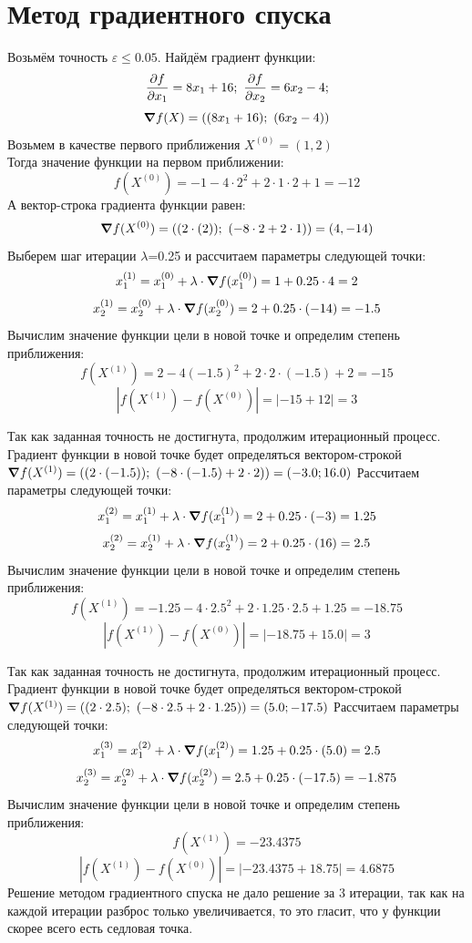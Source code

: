 \documentclass{article}
\begin{document}
\section*{Метод градиентного спуска}
Возьмём точность $\varepsilon \leq 0.05$. Найдём градиент функции:
\[\pdv{f}{x_1} = 8x_1+16;\ \pdv{f}{x_2} = 6x_2-4;\]
\[\grad f(X) = ((8x_1+16);\ (6x_2-4))\]
Возьмем в качестве первого приближения $X^{(0)} = (1, 2)$\\
Тогда значение функции на первом приближении:
\[f(X^{(0)}) = -1-4\cdot 2^2 + 2\cdot 1\cdot 2+ 1 = -12\]
А вектор-строка градиента функции равен:
\[\grad f(X^{(0)}) = ((2\cdot (2));\ (-8\cdot 2+2\cdot 1)) = (4, -14)\]
Выберем шаг итерации $\lambda$=0.25 и рассчитаем параметры следующей точки:
\[x_1^{(1)} = x_1^{(0)}+\lambda \cdot \grad f(x_1^{(0)}) = 1 + 0.25\cdot 4 = 2\]
\[x_2^{(1)} = x_2^{(0)}+\lambda \cdot \grad f(x_2^{(0)}) = 2 + 0.25\cdot (-14) = -1.5\]
Вычислим значение функции цели в новой точке и определим степень приближения:
\[f(X^{(1)}) = 2-4(-1.5)^2+2\cdot 2\cdot (-1.5)+2 = -15\]
\[|f(X^{(1)}) - f(X^{(0)})| = |-15 + 12| = 3\]

Так как заданная точность не достигнута, продолжим
итерационный процесс. Градиент функции в новой точке
будет определяться вектором-строкой $\grad f(X^{(1)}) = ((2\cdot (-1.5));\ (-8\cdot (-1.5)+2\cdot 2)) = (-3.0; 16.0)$
Рассчитаем параметры следующей точки:
\[x_1^{(2)} = x_1^{(1)}+\lambda \cdot \grad f(x_1^{(1)}) = 2 + 0.25\cdot (-3) = 1.25\]
\[x_2^{(2)} = x_2^{(1)}+\lambda \cdot \grad f(x_2^{(1)}) = 2 + 0.25\cdot (16) = 2.5\]
Вычислим значение функции цели в новой точке и определим степень приближения:
\[f(X^{(1)}) = -1.25-4\cdot 2.5^2+2\cdot 1.25\cdot 2.5+1.25 = -18.75\]
\[|f(X^{(1)}) - f(X^{(0)})| = |-18.75 + 15.0| = 3\]

Так как заданная точность не достигнута, продолжим
итерационный процесс. Градиент функции в новой точке
будет определяться вектором-строкой $\grad f(X^{(1)}) = ((2\cdot 2.5);\ (-8\cdot 2.5+2\cdot 1.25)) = (5.0; -17.5)$
Рассчитаем параметры следующей точки:
\[x_1^{(3)} = x_1^{(2)}+\lambda \cdot \grad f(x_1^{(2)}) = 1.25 + 0.25\cdot (5.0) = 2.5\]
\[x_2^{(3)} = x_2^{(2)}+\lambda \cdot \grad f(x_2^{(2)}) = 2.5 + 0.25\cdot (-17.5) = -1.875\]
Вычислим значение функции цели в новой точке и определим степень приближения:
\[f(X^{(1)}) = -23.4375\]
\[|f(X^{(1)}) - f(X^{(0)})| = |-23.4375+18.75| = 4.6875\]
Решение методом градиентного спуска не дало решение за 3 итерации, так как на каждой итерации разброс только увеличивается, то это гласит, что у функции скорее всего есть седловая точка.
\end{document}
